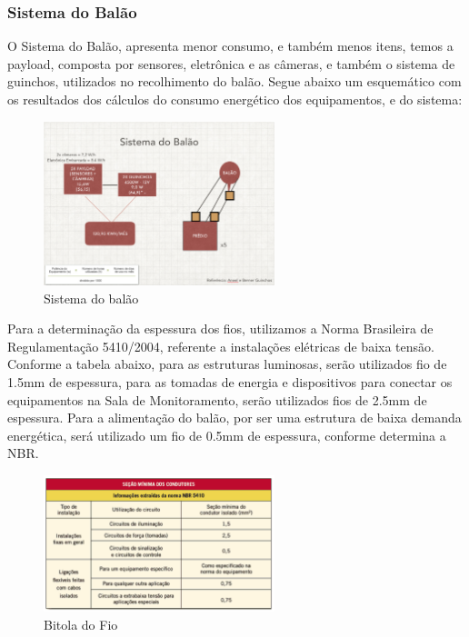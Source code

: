 \subsubsection{Sistema do Balão}

O Sistema do Balão, apresenta menor consumo, e também menos itens, temos a payload, composta por sensores, eletrônica e as câmeras, e também o sistema de guinchos, utilizados no recolhimento do balão.
Segue abaixo um esquemático com os resultados dos cálculos do consumo energético dos equipamentos, e do sistema:

\begin{figure}[H]
	\centering
	\includegraphics[width=0.6\textwidth]{figuras/sistemaBalao}
	\caption{Sistema do balão}
	\label{img:sistemaBalao}
\end{figure}


Para a determinação da espessura dos fios, utilizamos a Norma Brasileira de Regulamentação 5410/2004, referente a instalações elétricas de baixa tensão. Conforme a tabela abaixo, para as estruturas luminosas, serão utilizados fio de 1.5mm de espessura, para as tomadas de energia e dispositivos para conectar os equipamentos na Sala de Monitoramento, serão utilizados fios de 2.5mm de espessura. Para a alimentação do balão, por ser uma estrutura de baixa demanda energética, será utilizado um fio de 0.5mm de espessura, conforme determina a NBR.

\begin{figure}[H]
	\centering
	\includegraphics[width=0.6\textwidth]{figuras/BitoladoFio}
	\caption{Bitola do Fio}
	\label{img:BitoladoFio}
\end{figure}
